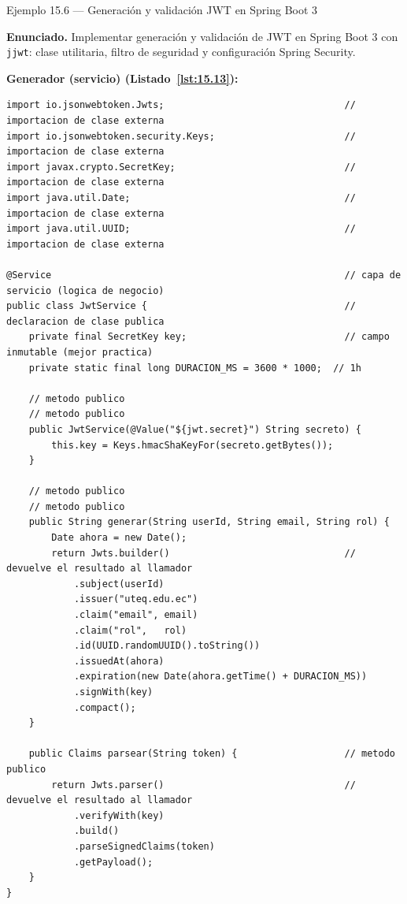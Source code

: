 \documentclass[11pt,a4paper,openany]{book}
\begin{document}
\begin{cajaejemplo}{Ejemplo 15.6 --- Generación y validación JWT en Spring Boot 3}

\textbf{Enunciado.} Implementar generación y validación de JWT en Spring Boot 3 con \texttt{jjwt}: clase utilitaria, filtro de seguridad y configuración Spring Security.

\textbf{Generador (servicio) (Listado~\ref{lst:15.13}):}
\begin{lstlisting}[style=java,numbers=none,caption={Ejemplo de Java},label=lst:15.13]
import io.jsonwebtoken.Jwts;                                // importacion de clase externa
import io.jsonwebtoken.security.Keys;                       // importacion de clase externa
import javax.crypto.SecretKey;                              // importacion de clase externa
import java.util.Date;                                      // importacion de clase externa
import java.util.UUID;                                      // importacion de clase externa

@Service                                                    // capa de servicio (logica de negocio)
public class JwtService {                                   // declaracion de clase publica
    private final SecretKey key;                            // campo inmutable (mejor practica)
    private static final long DURACION_MS = 3600 * 1000;  // 1h

    // metodo publico
    // metodo publico
    public JwtService(@Value("${jwt.secret}") String secreto) {
        this.key = Keys.hmacShaKeyFor(secreto.getBytes());
    }

    // metodo publico
    // metodo publico
    public String generar(String userId, String email, String rol) {
        Date ahora = new Date();
        return Jwts.builder()                               // devuelve el resultado al llamador
            .subject(userId)
            .issuer("uteq.edu.ec")
            .claim("email", email)
            .claim("rol",   rol)
            .id(UUID.randomUUID().toString())
            .issuedAt(ahora)
            .expiration(new Date(ahora.getTime() + DURACION_MS))
            .signWith(key)
            .compact();
    }

    public Claims parsear(String token) {                   // metodo publico
        return Jwts.parser()                                // devuelve el resultado al llamador
            .verifyWith(key)
            .build()
            .parseSignedClaims(token)
            .getPayload();
    }
}
\end{lstlisting}


\end{cajaejemplo}
\end{document}
